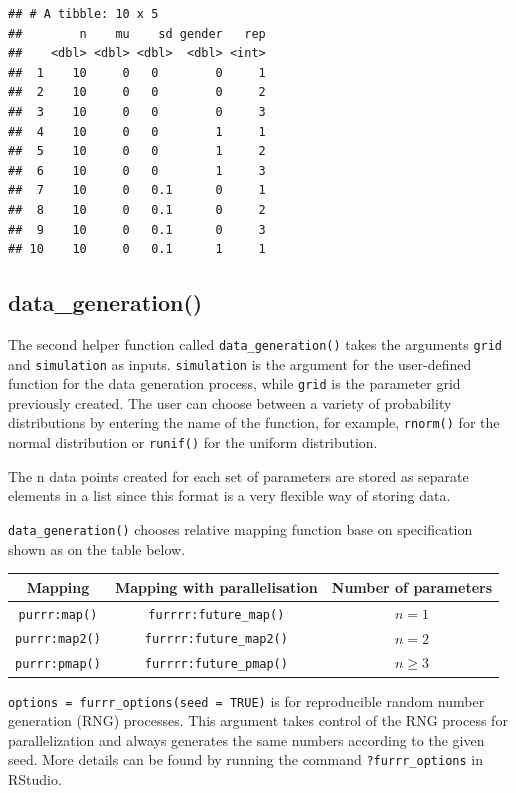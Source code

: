 \documentclass[11pt,a4paper]{article}
\begin{document}
\begin{verbatim}
## # A tibble: 10 x 5
##        n    mu    sd gender   rep
##    <dbl> <dbl> <dbl>  <dbl> <int>
##  1    10     0   0        0     1
##  2    10     0   0        0     2
##  3    10     0   0        0     3
##  4    10     0   0        1     1
##  5    10     0   0        1     2
##  6    10     0   0        1     3
##  7    10     0   0.1      0     1
##  8    10     0   0.1      0     2
##  9    10     0   0.1      0     3
## 10    10     0   0.1      1     1
\end{verbatim}

\hypertarget{data_generation}{%
\subsection{data\_generation()}\label{data_generation}}

The second helper function called \texttt{data\_generation()} takes the
arguments \texttt{grid} and \texttt{simulation} as inputs.
\texttt{simulation} is the argument for the user-defined function for
the data generation process, while \texttt{grid} is the parameter grid
previously created. The user can choose between a variety of probability
distributions by entering the name of the function, for example,
\texttt{rnorm()} for the normal distribution or \texttt{runif()} for the
uniform distribution.

The n data points created for each set of parameters are stored as
separate elements in a list since this format is a very flexible way of
storing data.

\texttt{data\_generation()} chooses relative mapping function base on
specification shown as on the table below.

\begin{longtable}[]{@{}ccc@{}}
\toprule()
Mapping & Mapping with parallelisation & Number of parameters \\
\midrule()
\endhead
\texttt{purrr:map()} & \texttt{furrrr:future\_map()} & \(n = 1\) \\
\texttt{purrr:map2()} & \texttt{furrrr:future\_map2()} & \(n = 2\) \\
\texttt{purrr:pmap()} & \texttt{furrrr:future\_pmap()} & \(n \geq 3\) \\
\bottomrule()
\end{longtable}

\texttt{options\ =\ furrr\_options(seed\ =\ TRUE)} is for reproducible
random number generation (RNG) processes. This argument takes control of
the RNG process for parallelization and always generates the same
numbers according to the given seed. More details can be found by
running the command \texttt{?furrr\_options} in RStudio.
\end{document}
